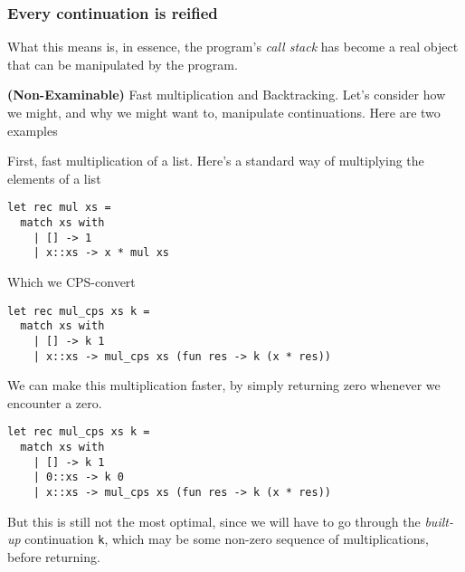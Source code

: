\subsubsection{Every continuation is reified}
What this means is, in essence, the program's \emph{call stack} has become a real object that can be manipulated by the program. 

{\sffamily \textbf{(Non-Examinable)} Fast multiplication and Backtracking}. Let's consider how we might, and why we might want to, manipulate continuations. Here are two examples

First, fast multiplication of a list. Here's a standard way of multiplying the elements of a list 

\begin{code}
\label{code:mul-ocaml}
\begin{verbatim}
let rec mul xs = 
  match xs with
    | [] -> 1
    | x::xs -> x * mul xs
\end{verbatim}
\end{code}

Which we CPS-convert

\begin{code}
\label{code:mul-ocaml-fast}
\begin{verbatim}
let rec mul_cps xs k = 
  match xs with
    | [] -> k 1
    | x::xs -> mul_cps xs (fun res -> k (x * res))
\end{verbatim}
\end{code}

We can make this multiplication faster, by simply returning zero whenever we encounter a zero. 

\begin{code}
\label{code:mul-ocaml-fastest}
\begin{verbatim}
let rec mul_cps xs k = 
  match xs with
    | [] -> k 1
    | 0::xs -> k 0
    | x::xs -> mul_cps xs (fun res -> k (x * res))
\end{verbatim}
\end{code}

But this is still not the most optimal, since we will have to go through the \emph{built-up} continuation \texttt{k}, which may be some non-zero sequence of multiplications, before returning. 

